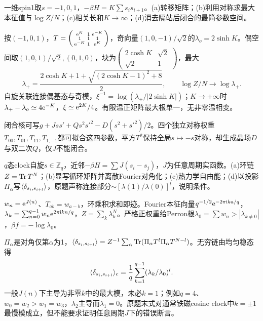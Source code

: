 \begin{exercise}[原题1(a)--(d)]\label{p:334-4-1}
一维spin1取$s=-1,0,1$，$-\beta H=K\sum s_is_{i+1}$。(a)转移矩阵；(b)利用对称求最大本征值与$\log Z/N$；(c)相关长和$K\to\infty$；(d)消去隔站后闭合的最简参数空间。
\end{exercise}
\begin{solution}
按$(-1,0,1)$，$T=\left(\begin{smallmatrix}\mathrm e^K&1&\mathrm e^{-K}\\1&1&1\\\mathrm e^{-K}&1&\mathrm e^K\end{smallmatrix}\right)$，奇向量$(1,0,-1)/\sqrt2$的$\lambda_o=2\sinh K$。偶空间取$(1,0,1)/\sqrt2,(0,1,0)$，块为$\left(\begin{smallmatrix}2\cosh K&\sqrt2\\\sqrt2&1\end{smallmatrix}\right)$，最大
\begin{equation}
\lambda_+=\frac{2\cosh K+1+\sqrt{(2\cosh K-1)^2+8}}2,\qquad \log Z/N\to\log\lambda_+.
\end{equation}
自旋关联连接偶基态与奇模，$\xi^{-1}=\log(\lambda_+/|2\sinh K|)$；$K\to+\infty$时$\lambda_+-\lambda_o\simeq4\mathrm e^{-K}$，$\xi\simeq\mathrm e^{2K}/4$。有限温正矩阵最大根单一，无非零温相变。

闭合核可写$g+Jss'+Qs^2s'^2-D(s^2+s'^2)/2$。四个独立对称权重$T_{00},T_{01},T_{11},T_{1,-1}$都可拟合这四参数，平方$T^2$保持全局$s\mapsto-s$对称，却生成晶场$D$与双二次$Q$，仅$J$不能闭合。
\end{solution}
\begin{exercise}[原题2(a)--(d)]\label{p:334-4-2}
$q$态clock自旋$s\in\mathbb Z_q$，近邻$-\beta H=\sum J(s_i-s_j)$，$J$为任意周期实函数。(a)环链$Z=\operatorname{Tr} T^N$；(b)显写循环矩阵并离散Fourier对角化；(c)热力学自由能；(d)以投影$\Pi_\alpha$写$\langle \delta_{s_i,s_{i+l}}\rangle$，原题声称连接部分$\sim[\lambda(1)/\lambda(0)]^l$，说明条件。
\end{exercise}
\begin{solution}
$w_n=\mathrm e^{J(n)}$、$T_{ab}=w_{a-b}$，环乘积求和即迹。Fourier本征向量$q^{-1/2}\mathrm e^{-2\pi\mathrm i ka/q}$，$\lambda_k=\sum_{n=0}^{q-1}w_n\mathrm e^{2\pi\mathrm i kn/q}$，$
Z=\sum_k\lambda_k^N$。严格正权重给Perron根$\lambda_0=\sum w_n>|\lambda_{k\ne0}|$，$\beta f=-\log\lambda_0$。

$\Pi_\alpha$是对角仅第$\alpha$为1，$\langle \delta_{s_i,s_{i+l}}\rangle=Z^{-1}\sum_\alpha\operatorname{Tr}(\Pi_\alpha T^l\Pi_\alpha T^{N-l})$。无穷链由均匀稳态得
\begin{equation}
\langle \delta_{s_i,s_{i+l}}\rangle_c=\frac1q\sum_{k=1}^{q-1}(\lambda_k/\lambda_0)^l.
\end{equation}
一般$J(n)$下主导为非零$k$中的最大模，未必$k=1$；例如$q=4$、$w_0=w_2>w_1=w_3$，$\lambda_2$主导而$\lambda_1=0$。原题末式对通常铁磁cosine clock中$k=\pm1$最慢模成立，但不能要求证明任意周期$J$下的错误断言。
\end{solution}
